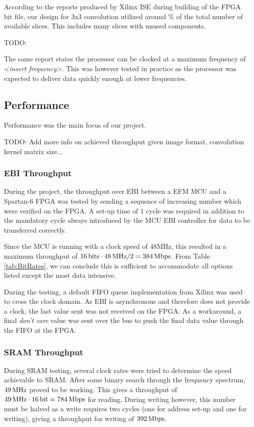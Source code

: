 According to the reports produced by Xilinx ISE during building of the FPGA bit file, our design for 3x3 convolution utilized around \unit[16]{\%} of the total number of available slices.
This includes many slices with unused components.

TODO:

The same report states the processor can be clocked at a maximum frequency of \emph{<insert frequency>}. This was however tested in practice as the processor was expected to deliver data quickly enough at lower frequencies.

\subsection{Performance}
Performance was the main focus of our project.

TODO: Add more info on achieved throughput given image format, convolution kernel matrix size...

\subsubsection{EBI Throughput} \label{subsec:EbiThroughput}
During the project, the throughput over EBI between a EFM MCU and a Spartan-6 FPGA was tested by sending a sequence of increasing number which were verified on the FPGA.
A set-up time of 1 cycle was required in addition to the mandatory cycle always introduced by the MCU EBI controller for data to be transferred correctly.

Since the MCU is running with a clock speed of 48MHz, this resulted in a maximum throughput of $\unit[16]{bits} \cdot \unit[48]{MHz} / 2 = \unit[384]{Mbps}$.
From Table \ref{tab:BitRates}, we can conclude this is sufficient to accommodate all options listed except the most data intensive.

During the testing, a default FIFO queue implementation from Xilinx was used to cross the clock domain.
As EBI is asynchronous and therefore does not provide a clock, the last value sent was not received on the FPGA.
As a workaround, a final \textit{don't care} value was sent over the bus to push the final data value through the FIFO at the FPGA.

\subsubsection{SRAM Throughput} \label{subsec:SramThroughput}
During SRAM testing, several clock rates were tried to determine the speed achievable to SRAM.
After some binary search through the frequency spectrum, $\unit[49]{MHz}$ proved to be working.
This gives a throughput of $\unit[49]{MHz}\cdot\unit[16]{bit} = \unit[784]{Mbps}$ for reading.
During writing however, this number must be halved as a write requires two cycles (one for address set-up and one for writing), giving a throughput for writing of $\unit[392]{Mbps}$.
